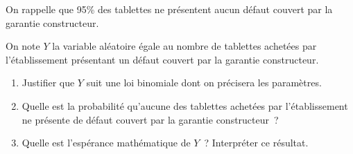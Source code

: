 On rappelle que 95\% des tablettes ne présentent aucun défaut couvert par la garantie constructeur.
\par
On note $Y$ la variable aléatoire égale au nombre de tablettes achetées par l'établissement présentant un défaut couvert par la garantie constructeur.
\begin{enumerate}
     \item %
     Justifier que $Y$ suit une loi binomiale dont on précisera les paramètres.
     \item %
     Quelle est la probabilité qu'aucune des tablettes achetées par l'établissement ne présente de défaut couvert par la garantie constructeur~?
     \item %
     \par
     Quelle est l'espérance mathématique de $Y$~? Interpréter ce résultat.
\end{enumerate}

